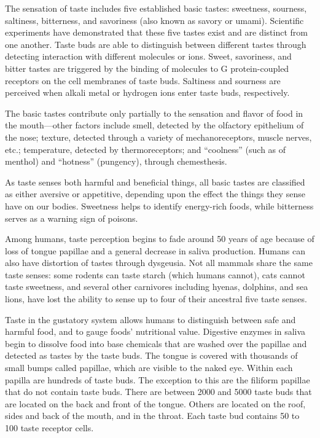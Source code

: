 \documentclass[]{book}
\begin{document}
The sensation of taste includes five established basic tastes: sweetness, sourness, saltiness, bitterness, and savoriness (also known as savory or umami). Scientific experiments have demonstrated that these five tastes exist and are distinct from one another. Taste buds are able to distinguish between different tastes through detecting interaction with different molecules or ions. Sweet, savoriness, and bitter tastes are triggered by the binding of molecules to G protein-coupled receptors on the cell membranes of taste buds. Saltiness and sourness are perceived when alkali metal or hydrogen ions enter taste buds, respectively.

The basic tastes contribute only partially to the sensation and flavor of food in the mouth---other factors include smell, detected by the olfactory epithelium of the nose; texture, detected through a variety of mechanoreceptors, muscle nerves, etc.; temperature, detected by thermoreceptors; and ``coolness'' (such as of menthol) and ``hotness'' (pungency), through chemesthesis.

As taste senses both harmful and beneficial things, all basic tastes are classified as either aversive or appetitive, depending upon the effect the things they sense have on our bodies. Sweetness helps to identify energy-rich foods, while bitterness serves as a warning sign of poisons.

Among humans, taste perception begins to fade around 50 years of age because of loss of tongue papillae and a general decrease in saliva production. Humans can also have distortion of tastes through dysgeusia. Not all mammals share the same taste senses: some rodents can taste starch (which humans cannot), cats cannot taste sweetness, and several other carnivores including hyenas, dolphins, and sea lions, have lost the ability to sense up to four of their ancestral five taste senses.

Taste in the gustatory system allows humans to distinguish between safe and harmful food, and to gauge foods' nutritional value. Digestive enzymes in saliva begin to dissolve food into base chemicals that are washed over the papillae and detected as tastes by the taste buds. The tongue is covered with thousands of small bumps called papillae, which are visible to the naked eye. Within each papilla are hundreds of taste buds. The exception to this are the filiform papillae that do not contain taste buds. There are between 2000 and 5000 taste buds that are located on the back and front of the tongue. Others are located on the roof, sides and back of the mouth, and in the throat. Each taste bud contains 50 to 100 taste receptor cells.
\end{document}
